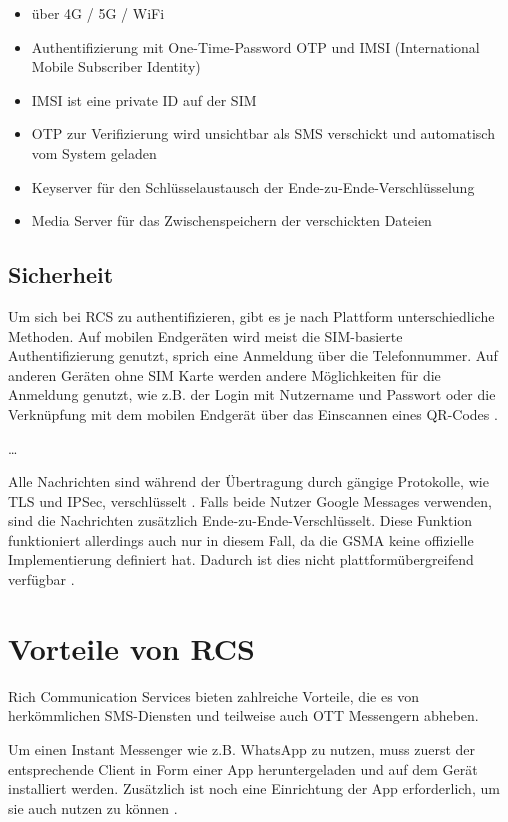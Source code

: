 \documentclass[conference]{IEEEtran}
\begin{document}
\begin{itemize}
    \item über 4G / 5G / WiFi
    \item Authentifizierung mit One-Time-Password OTP und IMSI (International Mobile Subscriber Identity)
    \item IMSI ist eine private ID auf der SIM
    \item OTP zur Verifizierung wird unsichtbar als SMS verschickt und automatisch vom System geladen
    \item Keyserver für den Schlüsselaustausch der Ende-zu-Ende-Verschlüsselung
    \item Media Server für das Zwischenspeichern der verschickten Dateien
\end{itemize}
\cite{5gmsg}

\subsection{Sicherheit}

Um sich bei RCS zu authentifizieren, gibt es je nach Plattform unterschiedliche Methoden.
Auf mobilen Endgeräten wird meist die SIM-basierte Authentifizierung genutzt, sprich eine Anmeldung über die Telefonnummer. Auf anderen Geräten ohne SIM Karte werden andere Möglichkeiten für die Anmeldung genutzt, wie z.B. der Login mit Nutzername und Passwort oder die Verknüpfung mit dem mobilen Endgerät über das Einscannen eines QR-Codes \cite{uniprof}.

\dots

Alle Nachrichten sind während der Übertragung durch gängige Protokolle, wie TLS und IPSec, verschlüsselt \cite{uniprof}.
Falls beide Nutzer Google Messages verwenden, sind die Nachrichten zusätzlich Ende-zu-Ende-Verschlüsselt.
Diese Funktion funktioniert allerdings auch nur in diesem Fall, da die GSMA keine offizielle Implementierung definiert hat.
Dadurch ist dies nicht plattformübergreifend verfügbar \cite{googlemessagessecure}.


\section{Vorteile von RCS}

Rich Communication Services bieten zahlreiche Vorteile, die es von herkömmlichen SMS-Diensten und teilweise auch OTT Messengern abheben.

Um einen Instant Messenger wie z.B. WhatsApp zu nutzen, muss zuerst der entsprechende Client in Form einer App heruntergeladen und auf dem Gerät installiert werden.
Zusätzlich ist noch eine Einrichtung der App erforderlich, um sie auch nutzen zu können \cite{5gmsg,rcsmno}.
\end{document}

